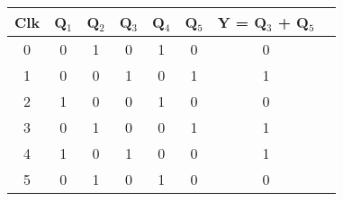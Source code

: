 \renewcommand{\arraystretch}{1.1}
\begin{tabular}{|c|c|c|c|c|c|c|c|}
\hline
\textbf{Clk}             & \textbf{Q$_1$} & \textbf{Q$_2$} & \textbf{Q$_3$} & \textbf{Q$_4$} & \textbf{Q$_5$} & \textbf{Y = Q$_3$ + Q$_5$} \\ \hline
{\color[HTML]{6200C9} 0} & 0              & 1              & 0              & 1              & 0              & 0                          \\ 
{\color[HTML]{6200C9} 1} & 0              & 0              & 1              & 0              & 1              & 1                          \\ 
{\color[HTML]{6200C9} 2} & 1              & 0              & 0              & 1              & 0              & 0                          \\ 
{\color[HTML]{6200C9} 3} & 0              & 1              & 0              & 0              & 1              & 1                          \\ 
{\color[HTML]{6200C9} 4} & 1              & 0              & 1              & 0              & 0              & 1                          \\ 
{\color[HTML]{6200C9} 5} & 0              & 1              & 0              & 1              & 0              & 0                          \\ \hline
\end{tabular}